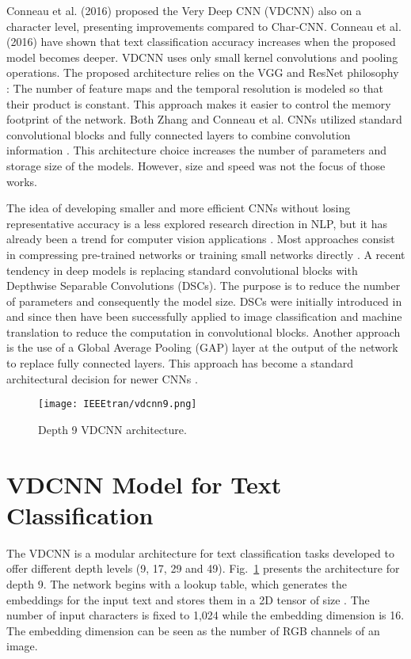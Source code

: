 \documentclass[conference]{IEEEtran}
\begin{document}
Conneau et al. (2016) proposed the Very Deep CNN (VDCNN) \cite{conneau2016very} also on a character level, presenting improvements compared to Char-CNN. Conneau et al. (2016) have shown that text classification accuracy increases when the proposed model becomes deeper. VDCNN uses only small kernel convolutions and pooling operations. The proposed architecture relies on the VGG and ResNet philosophy \cite{he2016deep,simonyan2014very}: The number of feature maps and the temporal resolution is modeled so that their product is constant.  This approach makes it easier to control the memory footprint of the network. Both Zhang and Conneau et al. CNNs utilized standard convolutional blocks and fully connected layers to combine convolution information \cite{zhang2015character, conneau2016very}. This architecture choice increases the number of parameters and storage size of the models. However, size and speed was not the focus of those works. 

The idea of developing smaller and more efficient CNNs without losing representative accuracy is a less explored research direction in NLP, but it has already been a trend for computer vision applications \cite{howard2017mobilenets,iandola2016squeezenet,santos2018reducing }.  Most approaches consist in compressing pre-trained networks or training small networks directly \cite{howard2017mobilenets}. A recent tendency in deep models is replacing standard convolutional blocks with Depthwise Separable Convolutions (DSCs). The purpose is to reduce the number of parameters and consequently the model size. DSCs were initially introduced in \cite{sifre2014rigid} and since then have been successfully applied to image classification and  \cite{howard2017mobilenets,santos2018reducing,chollet2017xception} machine translation \cite{kaiser2017depthwise} to reduce the computation in convolutional blocks.  Another approach is the use of a Global Average Pooling (GAP) layer at the output of the network to replace fully connected layers. This approach has become a standard architectural decision for newer CNNs \cite{he2016deep,huang2017densely}.

\begin{figure}[htbp]
\centering
\texttt{[image: IEEEtran/vdcnn9.png]}
\caption{Depth 9 VDCNN architecture.}
\label{vdcnn}
\end{figure}
 
\section{VDCNN Model for Text Classification}
The VDCNN is a modular architecture for text classification tasks developed to offer different depth levels (9, 17, 29 and 49). Fig.~\ref{vdcnn} presents the architecture for depth 9. The network begins with a lookup table, which generates the embeddings for the input text and stores them in a 2D tensor of size . The number of input characters  is fixed to 1,024 while the embedding dimension  is 16. The embedding dimension can be seen as the number of RGB channels of an image. 
\end{document}
